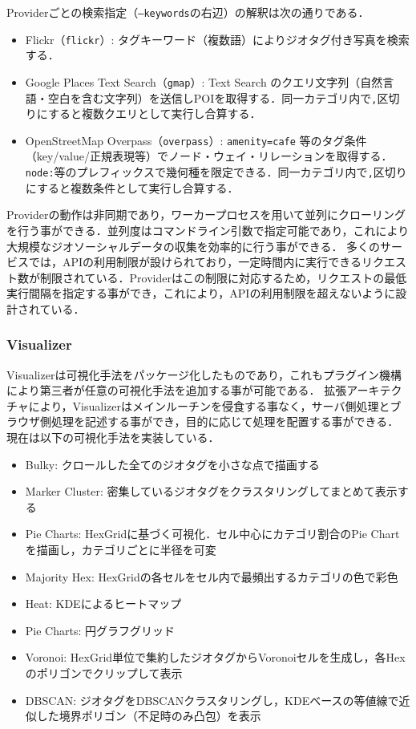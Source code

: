 \documentclass[11pt,a4paper]{jlreq}
\begin{document}
Providerごとの検索指定（\texttt{--keywords}の右辺）の解釈は次の通りである．
\begin{itemize}
  \item Flickr（\texttt{flickr}）: タグキーワード（複数語）によりジオタグ付き写真を検索する．
  \item Google Places Text Search（\texttt{gmap}）: Text Search のクエリ文字列（自然言語・空白を含む文字列）を送信しPOIを取得する．同一カテゴリ内で\texttt{,}区切りにすると複数クエリとして実行し合算する．
  \item OpenStreetMap Overpass（\texttt{overpass}）: \texttt{amenity=cafe} 等のタグ条件（key/value/正規表現等）でノード・ウェイ・リレーションを取得する．\texttt{node:}等のプレフィックスで幾何種を限定できる．同一カテゴリ内で\texttt{,}区切りにすると複数条件として実行し合算する．
\end{itemize}

Providerの動作は非同期であり，ワーカープロセスを用いて並列にクローリングを行う事ができる．並列度はコマンドライン引数で指定可能であり，これにより大規模なジオソーシャルデータの収集を効率的に行う事ができる．
多くのサービスでは，APIの利用制限が設けられており，一定時間内に実行できるリクエスト数が制限されている．Providerはこの制限に対応するため，リクエストの最低実行間隔を指定する事ができ，これにより，APIの利用制限を超えないように設計されている．
\subsubsection{Visualizer}

Visualizerは可視化手法をパッケージ化したものであり，これもプラグイン機構により第三者が任意の可視化手法を追加する事が可能である．
拡張アーキテクチャにより，Visualizerはメインルーチンを侵食する事なく，サーバ側処理とブラウザ側処理を記述する事ができ，目的に応じて処理を配置する事ができる．
現在は以下の可視化手法を実装している．
\begin{itemize}
    \item Bulky: クロールした全てのジオタグを小さな点で描画する
    \item Marker Cluster: 密集しているジオタグをクラスタリングしてまとめて表示する
    \item Pie Charts: HexGridに基づく可視化．セル中心にカテゴリ割合のPie Chartを描画し，カテゴリごとに半径を可変
    \item Majority Hex: HexGridの各セルをセル内で最頻出するカテゴリの色で彩色
    \item Heat: KDEによるヒートマップ
    \item Pie Charts: 円グラフグリッド
    \item Voronoi: HexGrid単位で集約したジオタグからVoronoiセルを生成し，各Hexのポリゴンでクリップして表示
    \item DBSCAN: ジオタグをDBSCANクラスタリングし，KDEベースの等値線で近似した境界ポリゴン（不足時のみ凸包）を表示
\end{itemize}
\end{document}
